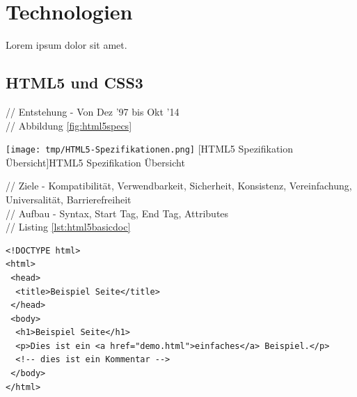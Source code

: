 \documentclass[12pt,a4paper,bibliography=totocnumbered,listof=totocnumbered]{scrartcl}
\begin{document}
\pagebreak
\section{Technologien}
Lorem ipsum dolor sit amet.
%

\subsection{HTML5 und CSS3}
// Entstehung - Von Dez '97 bis Okt '14\\
// Abbildung \ref{fig:html5specs}\\
	\vspace{1em}
	\begin{minipage}{\linewidth}
		\centering
		\texttt{[image: tmp/HTML5-Spezifikationen.png]}
		[HTML5 Spezifikation Übersicht]{HTML5 Spezifikation Übersicht\footnotemark }
		\label{fig:html5specs}
	\end{minipage}
	
// Ziele - Kompatibilität, Verwendbarkeit, Sicherheit, Konsistenz, Vereinfachung, Universalität, Barrierefreiheit\\
// Aufbau - Syntax, Start Tag, End Tag, Attributes\\
// Listing \ref{lst:html5basicdoc}
	\vspace{1em}
	\begin{lstlisting}[caption=HTML5 Basis Dokument, label=lst:html5basicdoc]
<!DOCTYPE html>
<html>
 <head>
  <title>Beispiel Seite</title>
 </head>
 <body>
  <h1>Beispiel Seite</h1>
  <p>Dies ist ein <a href="demo.html">einfaches</a> Beispiel.</p>
  <!-- dies ist ein Kommentar -->
 </body>
</html>
	\end{lstlisting}
	
\end{document}
